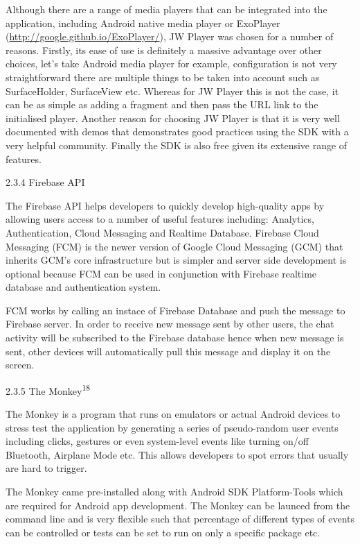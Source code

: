 \documentclass{article}
\begin{document}
\begin{flushleft}
Although there are a range of media players that can be integrated into the application, including Android native media player or ExoPlayer (\url {http://google.github.io/ExoPlayer/}), JW Player was chosen for a number of reasons. Firstly, its ease of use is definitely a massive advantage over other choices, let's take Android media player for example, configuration is not very straightforward there are multiple things to be taken into account such as SurfaceHolder, SurfaceView etc. Whereas for JW Player this is not the case, it can be as simple as adding a fragment and then pass the URL link to the initialised player. Another reason for choosing JW Player is that it is very well documented with demos that demonstrates good practices using the SDK with a very helpful community. Finally the SDK is also free given its extensive range of features.\par
{\large 2.3.4 Firebase API}\par
The Firebase API helps developers to quickly develop high-quality apps by allowing users access to a number of useful features including: Analytics, Authentication, Cloud Messaging and Realtime Database. Firebase Cloud Messaging (FCM) is the newer version of Google Cloud Messaging (GCM) that inherits GCM's core infrastructure but is simpler and server side development is optional because FCM can be used in conjunction with Firebase realtime database and authentication system.\par
FCM works by calling an instace of Firebase Database and push the message to Firebase server. In order to receive new message sent by other users, the chat activity will be subscribed to the Firebase database hence when new message is sent, other devices will automatically pull this message and display it on the screen.\par
{\large 2.3.5 The Monkey\textsuperscript{18}}\par
The Monkey is a program that runs on emulators or actual Android devices to stress test the application by generating a series of pseudo-random user events including clicks, gestures or even system-level events like turning on/off Bluetooth, Airplane Mode etc. This allows developers to spot errors that usually are hard to trigger.\par
The Monkey came pre-installed along with Android SDK Platform-Tools which are required for Android app development. The Monkey can be launced from the command line and is very flexible such that percentage of different types of events can be controlled or tests can be set to run on only a specific package etc.\par

\end{flushleft}
\end{document}
